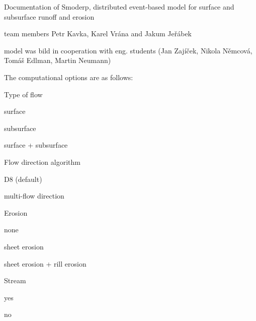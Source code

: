 Documentation of Smoderp, distributed event-\/based model for surface and subsurface runoff and erosion\par
 team members Petr Kavka, Karel Vrána and Jakum Jeřábek \par
 model was bild in cooperation with eng. students (Jan Zajíček, Nikola Němcová, Tomáš Edlman, Martin Neumann) \par
 The computational options are as follows\-:
\begin{DoxyItemize}
\item Type of flow
\begin{DoxyItemize}
\item surface
\item subsurface
\item surface + subsurface
\end{DoxyItemize}
\item Flow direction algorithm
\begin{DoxyItemize}
\item D8 (default)
\item multi-\/flow direction
\end{DoxyItemize}
\item Erosion
\begin{DoxyItemize}
\item none
\item sheet erosion
\item sheet erosion + rill erosion
\end{DoxyItemize}
\item Stream
\begin{DoxyItemize}
\item yes
\item no 
\end{DoxyItemize}
\end{DoxyItemize}